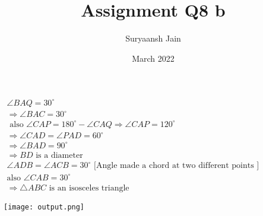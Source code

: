 \documentclass[article,12pt,twocolumn]{IEEEtran}
\title{Assignment Q8 b}
\author{Suryaansh Jain}
\date{March 2022}
\begin{document}
\maketitle


$
\begin{array}{l}
\angle B A Q=30^{\circ}\\
\Rightarrow \angle B A C=30^{\circ}\\
\text { also\  } \angle C A P=180^{\circ}-\angle C A Q \Rightarrow \angle C A P=120^{\circ}\\
\Rightarrow \angle C A D=\angle P A D=60^{\circ}\\
\Rightarrow \angle B A D=90^{\circ}\\
\Rightarrow B D \text {\ is\ a\ diameter }\\
\angle A D B=\angle A C B=30^{\circ} \text {\ [Angle\ made\ a\ chord\ at\ two\ different\ points\ ]}\\
\text {also\ } \angle C A B=30^{\circ}\\
\Rightarrow \triangle A B C \text {\ is\ an\ isosceles \ triangle }
\end{array}
$

\texttt{[image: output.png]}
\end{document}
